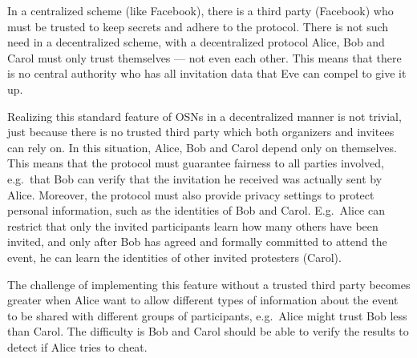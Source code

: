 
In a centralized scheme (like Facebook), there is a third party (Facebook) who 
must be trusted to keep secrets and adhere to the protocol.
There is not such need in a decentralized scheme, with a decentralized protocol
Alice, Bob and Carol must only trust themselves --- not even each other.
This means that there is no central authority who has all invitation data that 
Eve can compel to give it up.

Realizing this standard feature of \acp{OSN} in a decentralized manner is not 
trivial, just because there is no trusted third party which both organizers and 
invitees can rely on.
In this situation, Alice, Bob and Carol depend only on themselves.
This means that the protocol must guarantee fairness to all parties involved, 
e.g.\ that Bob can verify that the invitation he received was actually sent by 
Alice.
Moreover, the protocol must also provide privacy settings to protect personal 
information, such as the identities of Bob and Carol.
E.g.\ Alice can restrict that only the invited participants learn how many 
others have been invited, and only after Bob has agreed and formally committed 
to attend the event, he can learn the identities of other invited protesters 
(Carol).

The challenge of implementing this feature without a trusted third party 
becomes greater when Alice want to allow different types of information about 
the event to be shared with different groups of participants, e.g.\ Alice might 
trust Bob less than Carol.
The difficulty is Bob and Carol should be able to verify the results to detect 
if Alice tries to cheat.

